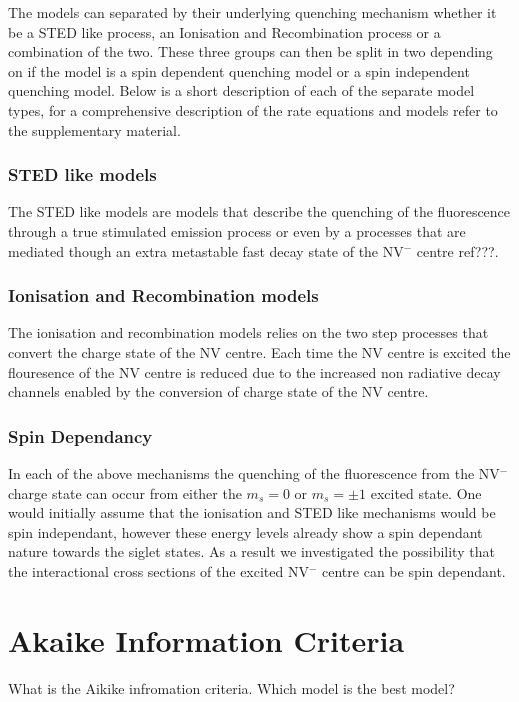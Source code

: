 \documentclass[,prl,twocolumn]{revtex4}
\begin{document}
The models can separated by their underlying quenching mechanism whether it be a STED like process, an Ionisation and Recombination process or a combination of the two. These three groups can then be split in two depending on if the model is a spin dependent quenching model or a spin independent quenching model. Below is a short description of each of the separate model types, for a comprehensive description of the rate equations and models refer to the supplementary material.

\subsubsection{STED like models}
The STED like models are models that describe the quenching of the fluorescence through a true stimulated emission process or even by a  processes that are mediated though an extra metastable fast decay state of the NV$^-$ centre ref???.

\subsubsection{Ionisation and Recombination models}
The ionisation and recombination models relies on the two step processes that convert the charge state of the NV centre. Each time the NV centre is excited the flouresence of the NV centre is reduced due to the increased non radiative decay channels enabled by the conversion of charge state of the NV centre.

\subsubsection{Spin Dependancy}
In each of the above mechanisms the quenching of the fluorescence from the NV$^-$ charge state can occur from either the $m_s=0$ or $m_s=\pm1$ excited state. One would initially assume that the ionisation and STED like mechanisms would be spin independant, however these energy levels already show a spin dependant nature towards the siglet states. 
As a result we investigated the possibility that the interactional cross sections of the excited NV$^-$ centre can be spin dependant.


\section{Akaike Information Criteria}
What is the Aikike infromation criteria.
Which model is the best model?
\end{document}
